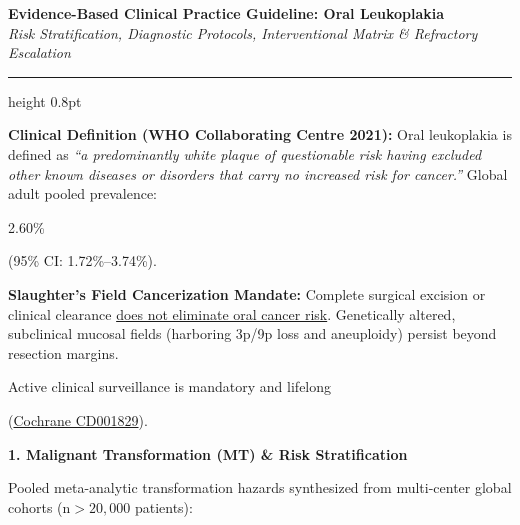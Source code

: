 \documentclass[9pt,a4paper]{article}
\newcommand{\hlg}[1]{\colorbox{hlgray}{\strut #1}}
\newcommand{\hly}[1]{\colorbox{hlyellow}{\strut #1}}
\begin{document}

\begin{center}
{\Large\bfseries Evidence-Based Clinical Practice Guideline: Oral Leukoplakia}\\[2pt]
{\small\itshape Risk Stratification, Diagnostic Protocols, Interventional Matrix \& Refractory Escalation}
\end{center}
\vspace{-4pt}
\hrule height 0.8pt
\vspace{4pt}

\textbf{Clinical Definition (WHO Collaborating Centre 2021):}
Oral leukoplakia is defined as \textit{``a predominantly white plaque of questionable risk having excluded other known diseases or disorders that carry no increased risk for cancer.''} Global adult pooled prevalence: \hlg{2.60\%} (95\% CI: 1.72\%--3.74\%).

\textbf{Slaughter's Field Cancerization Mandate:}
Complete surgical excision or clinical clearance \underline{does not eliminate oral cancer risk}. Genetically altered, subclinical mucosal fields (harboring 3p/9p loss and aneuploidy) persist beyond resection margins. \hly{Active clinical surveillance is mandatory and lifelong} (\href{https://pubmed.ncbi.nlm.nih.gov/27471822/}{Cochrane CD001829}).

\vspace{2pt}
{\large\bfseries 1. Malignant Transformation (MT) \& Risk Stratification}
\vspace{1pt}

Pooled meta-analytic transformation hazards synthesized from multi-center global cohorts ($\text{n}>20,000$ patients):
\end{document}
